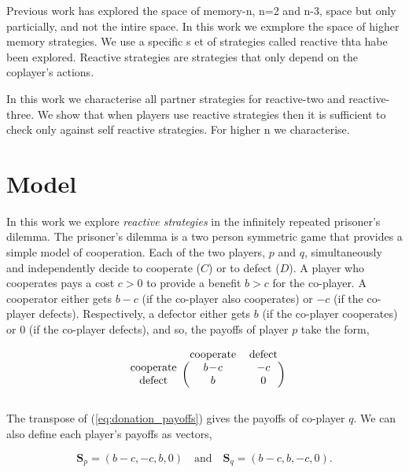 \documentclass{article}
\theoremstyle{definition}
\begin{document}
Previous work has explored the space of memory-n, n=2 and n-3, space but only
particially, and not the intire space. In this work we exmplore the space
of higher memory strategies. We use a specific s  et of strategies called reactive
thta habe been explored. Reactive strategies are strategies that only depend on
the coplayer's actions. 


In this work we characterise all partner strategies
for reactive-two and reactive-three. We show that when players use reactive
strategies then it is sufficient to check only against self reactive strategies.
For higher n we characterise.

\section{Model}

In this work we explore \textit{reactive strategies} in the infinitely repeated
prisoner's dilemma. The prisoner's dilemma is a two person symmetric game that
provides a simple model of cooperation. Each of the two players, \(p\) and
\(q\), simultaneously and independently decide to cooperate (\(C\)) or to defect
(\(D\)). A player who cooperates pays a cost \(c > 0\) to provide a benefit \(b
> c\) for the co-player. A cooperator either gets \(b\!-\!c\) (if the co-player
also cooperates) or \(-c\) (if the co-player defects). Respectively, a defector
either gets \(b\) (if the co-player cooperates) or 0 (if the co-player defects),
and so, the payoffs of player \(p\) take the form,

\begin{equation}\label{eq:donation_payoffs}
  \begin{blockarray}{ccc}
      & \text{cooperate} & \text{defect} \\
      \begin{block}{c(cc)}
          \text{cooperate} & b\!-\!c & -c \\
          \text{defect} & b & 0 \\
      \end{block}
  \end{blockarray}
\end{equation}

The transpose of (\ref{eq:donation_payoffs}) gives the payoffs of co-player
\(q\). We can also define each player's payoffs as vectors,

\begin{equation}\label{eq:vector_payoffs}
  \mathbf{S}_{p} = (b\!-\!c, -c, b, 0) \quad \textrm{and} \quad  \mathbf{S}_{q} = (b\!-\!c, b, -c, 0).
\end{equation}
\end{document}
